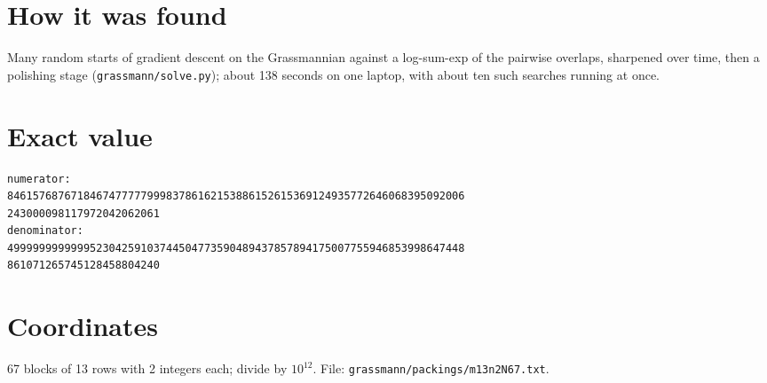 \documentclass[11pt,a4paper]{article}
\begin{document}
\section{How it was found}
Many random starts of gradient descent on the Grassmannian against a log-sum-exp of the pairwise overlaps, sharpened over time, then a polishing stage (\texttt{grassmann/solve.py}); about 138 seconds on one laptop, with about ten such searches running at once.


\appendix
\section{Exact value}
{\small
\begin{verbatim}
numerator:
846157687671846747777799983786162153886152615369124935772646068395092006
243000098117972042062061
denominator:
499999999999952304259103744504773590489437857894175007755946853998647448
861071265745128458804240
\end{verbatim}}

\section{Coordinates}
67 blocks of 13 rows with 2 integers each; divide by $10^{12}$. File: \texttt{grassmann/packings/m13n2N67.txt}.
{\tiny
\begin{multicols}{4}
\end{multicols}}
\end{document}
